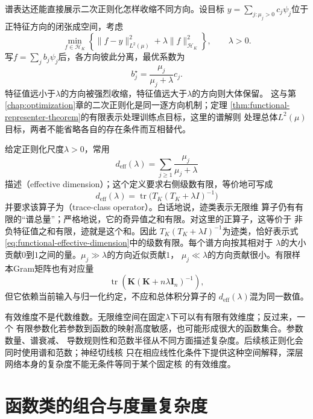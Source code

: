 谱表达还能直接展示二次正则化怎样收缩不同方向。设目标
$y=\sum_{j:\mu_j>0}c_j\psi_j$位于正特征方向的闭张成空间，考虑
\[
  \min_{f\in\mathcal{H}_K}
  \left\{
    \lVert f-y\rVert_{L^2(\mu)}^2
    +
    \lambda\lVert f\rVert_{\mathcal{H}_K}^2
  \right\},
  \qquad \lambda>0.
\]
写$f=\sum_jb_j\psi_j$后，各方向彼此分离，最优系数为
\begin{equation}
  b_j^\star
  =
  \frac{\mu_j}{\mu_j+\lambda}c_j.
  \label{eq:functional-spectral-shrinkage}
\end{equation}
特征值远小于$\lambda$的方向被强烈收缩，特征值远大于$\lambda$的方向则大体保留。
这与第\ref{chap:optimization}章的二次正则化是同一逐方向机制；定理
\ref{thm:functional-representer-theorem}的有限表示处理训练点目标，这里的谱解则
处理总体$L^2(\mu)$目标，两者不能省略各自的存在条件而互相替代。

给定正则化尺度$\lambda>0$，常用
\begin{equation}
  d_{\mathrm{eff}}(\lambda)
  =
  \sum_{j\geq1}\frac{\mu_j}{\mu_j+\lambda}
  \label{eq:functional-effective-dimension}
\end{equation}
描述（effective dimension）；这个定义要求右侧级数有限，等价地可写成
\[
  d_{\mathrm{eff}}(\lambda)
  =
  \operatorname{tr}\bigl(T_K(T_K+\lambda I)^{-1}\bigr)
\]
并要求该算子为（trace-class operator）。白话地说，迹类表示无限维
算子仍有有限的“谱总量”；严格地说，它的奇异值之和有限。对这里的正算子，这等价于
非负特征值之和有限，迹就是这个和。因此
$T_K(T_K+\lambda I)^{-1}$为迹类，恰好表示式
\eqref{eq:functional-effective-dimension}中的级数有限。每个谱方向按其相对于
$\lambda$的大小贡献$0$到$1$之间的量。$\mu_j\gg\lambda$的方向近似贡献$1$，
$\mu_j\ll\lambda$的方向贡献很小。有限样本Gram矩阵也有对应量
\[
  \operatorname{tr}\left(
    \bm{K}(\bm{K}+n\lambda\bm{I}_n)^{-1}
  \right),
\]
但它依赖当前输入与归一化约定，不应和总体积分算子的
$d_{\mathrm{eff}}(\lambda)$混为同一数值。

有效维度不是代数维数。无限维空间在固定$\lambda$下可以有有限有效维度；反过来，一个
有限参数化若参数到函数的映射高度敏感，也可能形成很大的函数集合。参数数量、谱衰减、
导数规则性和范数半径从不同方面描述复杂度。后续核正则化会同时使用谱和范数；神经切线核
只在相应线性化条件下提供这种空间解释，深层网络本身的复杂度不能无条件等同于某个固定核
的有效维度。

\section{函数类的组合与度量复杂度}
\label{sec:functional-combinatorial-metric-complexity}

